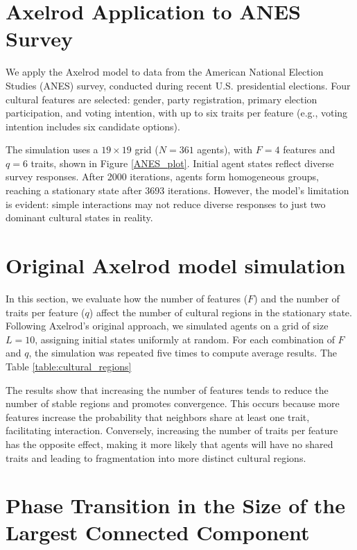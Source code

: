 \section{Axelrod Application to ANES Survey}

We apply the Axelrod model to data from the American National Election Studies (ANES) survey, conducted during recent U.S. presidential elections. Four cultural features are selected: gender, party registration, primary election participation, and voting intention, with up to six traits per feature (e.g., voting intention includes six candidate options).

The simulation uses a $19 \times 19$ grid ($N=361$ agents), with $F=4$ features and $q=6$ traits, shown in Figure \ref{ANES_plot}. Initial agent states reflect diverse survey responses. After 2000 iterations, agents form homogeneous groups, reaching a stationary state after 3693 iterations. However, the model’s limitation is evident: simple interactions may not reduce diverse responses to just two dominant cultural states in reality.


\section{Original Axelrod model simulation}

In this section, we evaluate how the number of features ($F$) and the number of traits per feature ($q$) affect the number of cultural regions in the stationary state. Following Axelrod's original approach, we simulated agents on a grid of size $L=10$, assigning initial states uniformly at random. For each combination of $F$ and $q$, the simulation was repeated five times to compute average results. The Table \ref{table:cultural_regions}



The results show that increasing the number of features tends to reduce the number of stable regions and promotes convergence. This occurs because more features increase the probability that neighbors share at least one trait, facilitating interaction. Conversely, increasing the number of traits per feature has the opposite effect, making it more likely that agents will have no shared traits and leading to fragmentation into more distinct cultural regions.

\section{Phase Transition in the Size of the Largest Connected Component}

